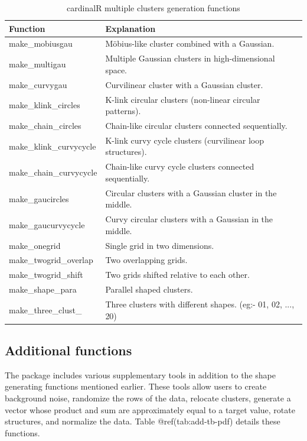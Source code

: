\documentclass[
  11pt,
  a4paper,
]{report}
\begin{document}
\begin{table}

\caption{\label{tab:odd-shape-tb-pdf}cardinalR multiple clusters generation functions}
\centering
\begin{tabular}[t]{>{\raggedright\arraybackslash}p{3.5cm}>{\raggedright\arraybackslash}p{8.5cm}}
\toprule
Function & Explanation\\
\midrule
make\_mobiusgau & Möbius-like cluster combined with a Gaussian.\\
make\_multigau & Multiple Gaussian clusters in high-dimensional space.\\
make\_curvygau & Curvilinear cluster with a Gaussian cluster.\\
make\_klink\_circles & K-link circular clusters (non-linear circular patterns).\\
make\_chain\_circles & Chain-like circular clusters connected sequentially.\\
make\_klink\_curvycycle & K-link curvy cycle clusters (curvilinear loop structures).\\
make\_chain\_curvycycle & Chain-like curvy cycle clusters connected sequentially.\\
make\_gaucircles & Circular clusters with a Gaussian cluster in the middle.\\
make\_gaucurvycycle & Curvy circular clusters with a Gaussian in the middle.\\
make\_onegrid & Single grid in two dimensions.\\
make\_twogrid\_overlap & Two overlapping grids.\\
make\_twogrid\_shift & Two grids shifted relative to each other.\\
make\_shape\_para & Parallel shaped clusters.\\
make\_three\_clust\_ & Three clusters with different shapes. (eg:- 01, 02, ..., 20)\\
\bottomrule
\end{tabular}
\end{table}

\subsection{Additional functions}\label{additional-functions}

The package includes various supplementary tools in addition to the
shape generating functions mentioned earlier. These tools allow users to
create background noise, randomize the rows of the data, relocate
clusters, generate a vector whose product and sum are approximately
equal to a target value, rotate structures, and normalize the data.
Table @ref(tab:add-tb-pdf) details these functions.
\end{document}
